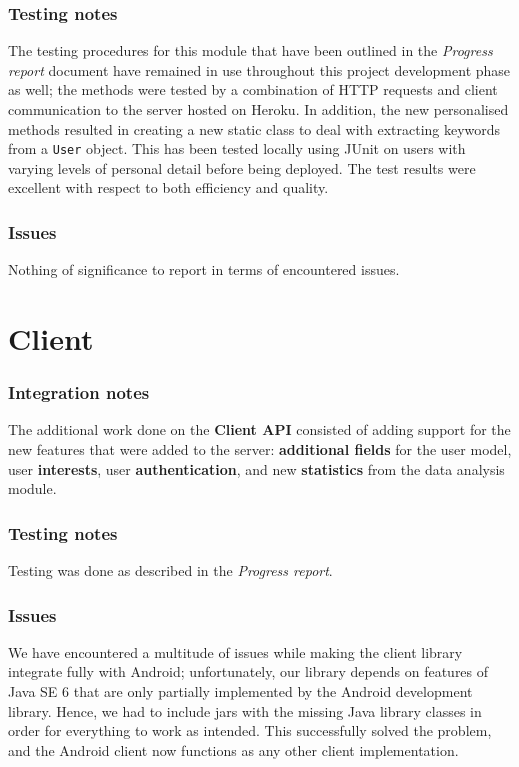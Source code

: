\documentclass[12p, a4paper, onecolumn]{report}
\begin{document}
\subsubsection{Testing notes}

The testing procedures for this module that have been outlined in the \emph{Progress report} document have remained in use throughout this project development phase as well; the methods were tested by a combination of HTTP requests and client communication to the server hosted on Heroku. In addition, the new personalised methods resulted in creating a new static class to deal with extracting keywords from a \texttt{User} object. This has been tested locally using JUnit on users with varying levels of personal detail before being deployed. The test results were excellent with respect to both efficiency and quality.

\subsubsection{Issues}

Nothing of significance to report in terms of encountered issues.

\section{Client}

\subsubsection{Integration notes}

The additional work done on the \textbf{Client API} consisted of adding support for the new features that were added to the server: \textbf{additional fields} for the user model, user \textbf{interests}, user \textbf{authentication}, and new \textbf{statistics} from the data analysis module.

\subsubsection{Testing notes} 

Testing was done as described in the \emph{Progress report}.

\subsubsection{Issues}

We have encountered a multitude of issues while making the client library integrate fully with Android; unfortunately, our library depends on features of Java SE 6 that are only partially implemented by the Android development library. Hence, we had to include jars with the missing Java library classes in order for everything to work as intended. This successfully solved the problem, and the Android client now functions as any other client implementation.
\end{document}
